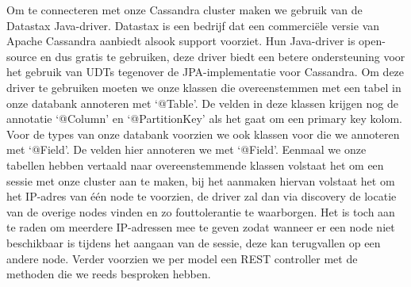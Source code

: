 \par
Om te connecteren met onze Cassandra cluster maken we gebruik van de Datastax Java-driver. Datastax is een bedrijf dat een commerci\"ele versie van Apache Cassandra aanbiedt alsook support voorziet. Hun Java-driver is open-source en dus gratis te gebruiken, deze driver biedt een betere ondersteuning voor het gebruik van UDTs tegenover de JPA-implementatie voor Cassandra. Om deze driver te gebruiken moeten we onze klassen die overeenstemmen met een tabel in onze databank annoteren met ‘@Table’. De velden in deze klassen krijgen nog de annotatie ‘@Column’ en ‘@PartitionKey’ als het gaat om een primary key kolom. Voor de types van onze databank voorzien we ook klassen voor die we annoteren met ‘@Field’. De velden hier annoteren we met ‘@Field’. Eenmaal we onze tabellen hebben vertaald naar overeenstemmende klassen volstaat het om een sessie met onze cluster aan te maken, bij het aanmaken hiervan volstaat het om het IP-adres van \'e\'en node te voorzien, de driver zal dan via discovery de locatie van de overige nodes vinden en zo fouttolerantie te waarborgen. Het is toch aan te raden om meerdere IP-adressen mee te geven zodat wanneer er een node niet beschikbaar is tijdens het aangaan van de sessie, deze kan terugvallen op een andere node. Verder voorzien we per model een REST controller met de methoden die we reeds besproken hebben.
\par
